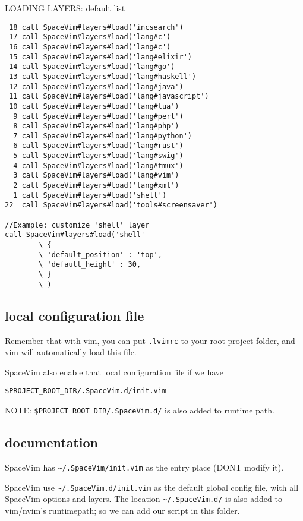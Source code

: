 LOADING LAYERS: default list
\begin{verbatim}
 18 call SpaceVim#layers#load('incsearch')
 17 call SpaceVim#layers#load('lang#c')
 16 call SpaceVim#layers#load('lang#c')
 15 call SpaceVim#layers#load('lang#elixir')
 14 call SpaceVim#layers#load('lang#go')
 13 call SpaceVim#layers#load('lang#haskell')
 12 call SpaceVim#layers#load('lang#java')
 11 call SpaceVim#layers#load('lang#javascript')
 10 call SpaceVim#layers#load('lang#lua')
  9 call SpaceVim#layers#load('lang#perl')
  8 call SpaceVim#layers#load('lang#php')
  7 call SpaceVim#layers#load('lang#python')
  6 call SpaceVim#layers#load('lang#rust')
  5 call SpaceVim#layers#load('lang#swig')
  4 call SpaceVim#layers#load('lang#tmux')
  3 call SpaceVim#layers#load('lang#vim')
  2 call SpaceVim#layers#load('lang#xml')
  1 call SpaceVim#layers#load('shell')                                                                                                                                           22  call SpaceVim#layers#load('tools#screensaver')
  
//Example: customize 'shell' layer
call SpaceVim#layers#load('shell'
        \ {
        \ 'default_position' : 'top',
        \ 'default_height' : 30,
        \ }
        \ )
\end{verbatim}

\subsection{local configuration file}

Remember that with vim, you can put \verb!.lvimrc!
to your root project folder, and vim will automatically load this file.

SpaceVim also enable that local configuration file if we have
\begin{verbatim}
$PROJECT_ROOT_DIR/.SpaceVim.d/init.vim
\end{verbatim}
NOTE: \verb!$PROJECT_ROOT_DIR/.SpaceVim.d/! is also added to runtime path. 

\subsection{documentation}

SpaceVim has \verb!~/.SpaceVim/init.vim! as the entry place (DONT modify it).

SpaceVim use \verb!~/.SpaceVim.d/init.vim! as the default global config file,
with all SpaceVim options and layers. The location 
\verb!~/.SpaceVim.d/! is also added to vim/nvim's runtimepath; so we can add our
script in this folder. 


